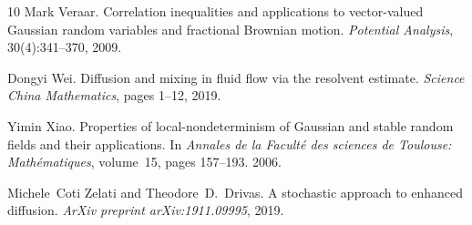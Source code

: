 \documentclass[11pt,oneside,reqno]{amsart}
\newcommand{\tmtextit}[1]{{{\itshape{#1}}}}
\numberwithin{equation}{section}
\begin{document}
\begin{thebibliography}{10}
  Mark Veraar. {\newblock}Correlation inequalities and
  applications to vector-valued Gaussian random variables and fractional
  Brownian motion. {\newblock}\tmtextit{Potential Analysis}, 30(4):341--370,
  2009.{\newblock}
  
  Dongyi Wei. {\newblock}Diffusion and mixing in fluid flow
  via the resolvent estimate. {\newblock}\tmtextit{Science China Mathematics},
  pages  1--12, 2019.{\newblock}
  
  Yimin Xiao. {\newblock}Properties of local-nondeterminism
  of Gaussian and stable random fields and their applications. {\newblock}In
  \tmtextit{Annales de la Facult{\'e} des sciences de Toulouse:
  Math{\'e}matiques},  volume~15,  pages  157--193. 2006.{\newblock}
  
  Michele~Coti Zelati  and  Theodore~D.~Drivas.
  {\newblock}A stochastic approach to enhanced diffusion.
  {\newblock}\tmtextit{ArXiv preprint arXiv:1911.09995}, 2019.{\newblock}
\end{thebibliography}

\
\end{document}
